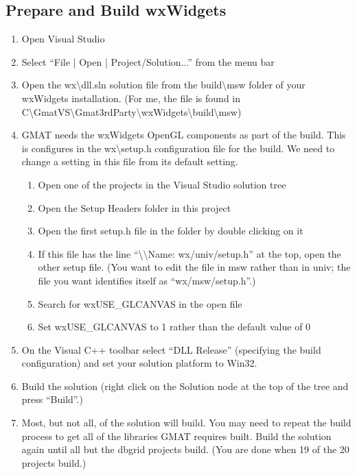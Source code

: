 \documentclass[letterpaper,10pt]{article}%
\begin{document}
\subsection{Prepare and Build wxWidgets}
\begin{enumerate}
\item Open Visual Studio
\item Select ``File | Open | Project/Solution...'' from the menu bar
\item Open the wx\textbackslash dll.sln solution file from the build\textbackslash msw folder of your wxWidgets installation.  (For me, the file is found in  C\:\textbackslash GmatVS\textbackslash Gmat3rdParty\textbackslash wxWidgets\textbackslash build\textbackslash msw)
\item GMAT needs the wxWidgets OpenGL components as part of the build.  This is configures in the wx\textbackslash setup.h configuration file for the build.  We need to change a setting in this file from its default setting.
\begin{enumerate}
	\item Open one of the projects in the Visual Studio solution tree
	\item Open the Setup Headers folder in this project
	\item Open the first setup.h file in the folder by double clicking on it
	\item If this file has the line ``\textbackslash\textbackslash  Name:        wx/univ/setup.h'' at the top, open the other setup file. (You want to edit the file in msw rather than in univ; the file you want identifies itself as ``wx/msw/setup.h''.)
	\item Search for wxUSE\_GLCANVAS in the open file
	\item Set wxUSE\_GLCANVAS to 1 rather than the default value of 0
\end{enumerate}
\item On the Visual C++ toolbar select ``DLL Release'' (specifying the build configuration) and set your solution platform to Win32.
\item Build the solution (right click on the Solution node at the top of the tree and press ``Build''.)
\item Most, but not all, of the solution will build.  You may need to repeat the build process to get all of the libraries GMAT requires built.  Build the solution again until all but the dbgrid projects build.  (You are done when 19 of the 20 projects build.)
\end{enumerate}
\end{document}
